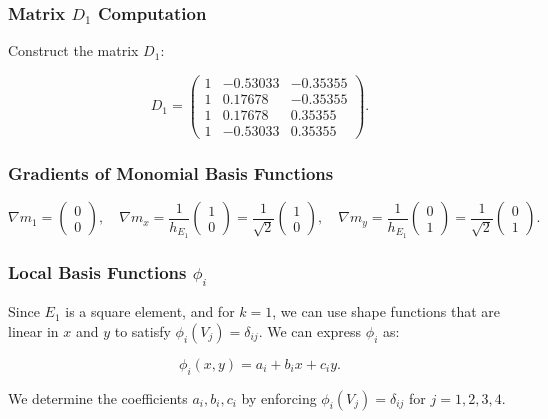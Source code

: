 \documentclass[class=article, crop=false]{standalone}
\begin{document}
\subsubsection{Matrix \( D_1 \) Computation}

Construct the matrix \( D_1 \):

\[
D_1 = \begin{pmatrix}
1 & -0.53033 & -0.35355 \\
1 & 0.17678 & -0.35355 \\
1 & 0.17678 & 0.35355 \\
1 & -0.53033 & 0.35355
\end{pmatrix}.
\]

\subsubsection{Gradients of Monomial Basis Functions}

\[
\nabla m_1 = \begin{pmatrix} 0 \\ 0 \end{pmatrix}, \quad
\nabla m_x = \dfrac{1}{h_{E_1}} \begin{pmatrix} 1 \\ 0 \end{pmatrix} = \dfrac{1}{\sqrt{2}} \begin{pmatrix} 1 \\ 0 \end{pmatrix}, \quad
\nabla m_y = \dfrac{1}{h_{E_1}} \begin{pmatrix} 0 \\ 1 \end{pmatrix} = \dfrac{1}{\sqrt{2}} \begin{pmatrix} 0 \\ 1 \end{pmatrix}.
\]

\subsubsection{Local Basis Functions \( \phi_i \)}

Since \( E_1 \) is a square element, and for \( k = 1 \), we can use shape functions that are linear in \( x \) and \( y \) to satisfy \( \phi_i(V_j) = \delta_{ij} \). We can express \( \phi_i \) as:

\[
\phi_i(x, y) = a_i + b_i x + c_i y.
\]

We determine the coefficients \( a_i, b_i, c_i \) by enforcing \( \phi_i(V_j) = \delta_{ij} \) for \( j = 1, 2, 3, 4 \).
\end{document}
